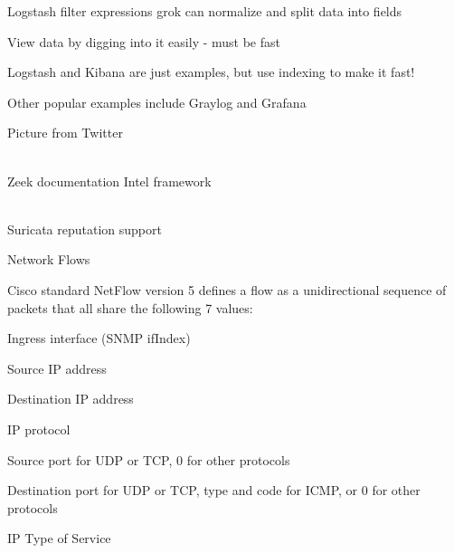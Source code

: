 \documentclass[Screen16to9,17pt]{foils}
\begin{document}
\begin{list2}
\item Logstash filter expressions grok can normalize and split data into fields
\end{list2}





\begin{list1}
\item View data by digging into it easily - must be fast
\item Logstash and Kibana are just examples, but use indexing to make it fast!
\item Other popular examples include Graylog and Grafana
\end{list1}




Picture from Twitter\\
\\



\begin{list1}
\item Zeek documentation Intel framework\\
\\
\item Suricata reputation support\\
\end{list1}







\begin{list1}
\item Network Flows
\item Cisco standard NetFlow version 5 defines a flow as a unidirectional sequence of packets that all share the following 7 values:
\begin{list2}
\item Ingress interface (SNMP ifIndex)
\item Source IP address
\item Destination IP address
\item IP protocol
\item Source port for UDP or TCP, 0 for other protocols
\item Destination port for UDP or TCP, type and code for ICMP, or 0 for other protocols
\item IP Type of Service
\end{list2}
\end{list1}
\end{document}
